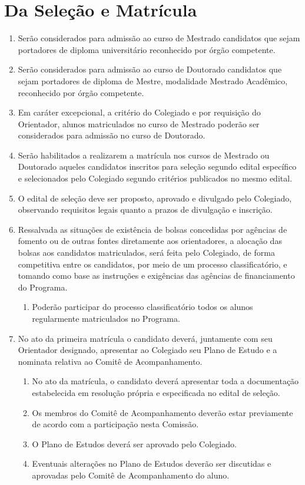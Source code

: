 \documentclass{article}
\begin{document}
\section{Da Seleção e Matrícula}
\begin{enumerate}
	\item Serão considerados para admissão ao curso de Mestrado candidatos que sejam portadores de diploma universitário reconhecido por órgão competente.
	\item Serão considerados para admissão ao curso de Doutorado candidatos que sejam portadores de diploma de Mestre, modalidade Mestrado Acadêmico, reconhecido por órgão competente.
	\item Em caráter excepcional, a critério do Colegiado e por requisição do Orientador, alunos matriculados no curso de Mestrado poderão ser considerados para admissão no curso de Doutorado.
	\item Serão habilitados a realizarem a matrícula nos cursos de Mestrado ou Doutorado aqueles candidatos inscritos para seleção segundo edital específico e selecionados pelo Colegiado segundo critérios publicados no mesmo edital.
	\item O edital de seleção deve ser proposto, aprovado e divulgado pelo Colegiado, observando requisitos legais quanto a prazos de divulgação e inscrição.
	\item Ressalvada as situações de existência de bolsas concedidas por agências de fomento ou de outras fontes diretamente aos orientadores, a alocação das bolsas aos candidatos matriculados, será feita pelo Colegiado, de forma competitiva entre os candidatos, por meio de um processo classificatório, e tomando como base as instruções e exigências das agências de financiamento do Programa.
	\begin{enumerate}
		\item Poderão participar do processo classificatório todos os alunos regularmente matriculados no Programa.
	\end{enumerate}
	
	\item No ato da primeira matrícula o candidato deverá, juntamente com seu Orientador designado, apresentar ao Colegiado seu Plano de Estudo e a nominata relativa ao Comitê de Acompanhamento.
	\begin{enumerate}
		\item No ato da matrícula, o candidato deverá apresentar toda a documentação estabelecida em resolução própria e especificada no edital de seleção.
		\item Os membros do Comitê de Acompanhamento deverão estar previamente de acordo com a participação nesta Comissão.
		\item O Plano de Estudos deverá ser aprovado pelo Colegiado.
		\item Eventuais alterações no Plano de Estudos deverão ser discutidas e aprovadas pelo Comitê de Acompanhamento do aluno.
	\end{enumerate}


\end{enumerate}
\end{document}
